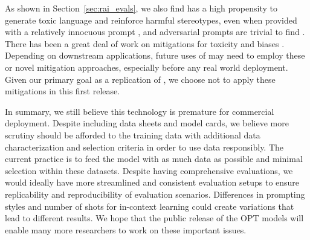 As shown in Section~\ref{sec:rai_evals}, we also find \OPT{} has a high propensity to generate toxic language and reinforce harmful stereotypes, even when provided with a relatively innocuous prompt \cite{gehman2020realtoxicityprompts}, and adversarial prompts are trivial to find \cite{dinan2021anticipating}. There has been a great deal of work on mitigations for toxicity and biases \cite{dathathri2019plug,dinan2019build,sheng2019woman,dinan-etal-2020-queens,liu2019does,krause2020gedi,xu2020recipes,liang2021towards,dinan2021anticipating,xu-etal-2021-bot,dhamala2021bold,schick2021self,ouyang2022training}. Depending on downstream applications, future uses of \OPT{} may need to employ these or novel mitigation approaches, especially before any real world deployment. Given our primary goal as a replication of \biggpt{}, we choose not to apply these mitigations in this first release.


In summary, we still believe this technology is premature for commercial deployment. Despite including data sheets and model cards, we believe more scrutiny should be afforded to the training data with additional data characterization and selection criteria in order to use data responsibly. The current practice is to feed the model with as much data as possible and minimal selection within these datasets. Despite having comprehensive evaluations, we would ideally have more streamlined and consistent evaluation setups to ensure replicability and reproducibility of evaluation scenarios. Differences in prompting styles and number of shots for in-context learning could create variations that lead to different results. We hope that the public release of the OPT models will enable many more researchers to work on these important issues.
